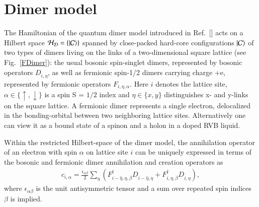 \documentclass[aps,pra,reprint,showpacs,superscriptaddress]{revtex4-1}
\DeclarePairedDelimiter\ket{\lvert}{\rangle}
\newcommand{\cre}[2]{{#1}^{\dagger}_{#2}}
\newcommand{\ann}[2]{{#1}^{\phantom{\dagger}}_{#2}}
\begin{document}
\section{Dimer model}\label{Model}


The Hamiltonian of the quantum dimer model introduced in Ref.~[] acts on a Hilbert space $\mathcal{H_D}= \{ \ket{\mathcal{C}} \}$ spanned by close-packed hard-core configurations $ \ket{\mathcal{C}} $ of two types of dimers living on the links of a two-dimensional square lattice (see Fig.~\ref{FDimer}): the usual bosonic spin-singlet dimers, represented by bosonic operators $\ann{D}{i,\eta}$, as well as fermionic spin-1/2 dimers carrying charge +e, represented by fermionic operators $F_{i,\eta,\alpha}$. Here $i$ denotes the lattice site, $\alpha \in \{\uparrow,\downarrow\}$ is a spin S = $1/2$ index and $\eta \in \{x,y\}$ distinguishes x- and y-links on the square lattice. A fermionic dimer represents a single electron, delocalized in the bonding-orbital between two neighboring lattice sites. Alternatively one can view it as a bound state of a spinon and a holon in a doped RVB liquid.
 
Within the restricted Hilbert-space of the dimer model, the annihilation operator of an electron with spin $\alpha$ on lattice site $i$ can be uniquely expressed in terms of the bosonic and fermionic dimer annihilation and creation operators as \cite{punk2015quantum}\begin{align}
c_{i,\alpha}=\frac{\epsilon_{\alpha\beta}}{2}\sum_{\eta} \left( \cre{F}{i-\hat{\eta},\eta,\beta}\ann{D}{i-\hat{\eta},\eta}+\cre{F}{i,\eta,\beta}\ann{D}{i,\eta} \right) ,\label{MAP}
\end{align}
where $\epsilon_{\alpha\beta}$ is the unit antisymmetric tensor and a sum over repeated spin indices $\beta$ is implied.
\end{document}
